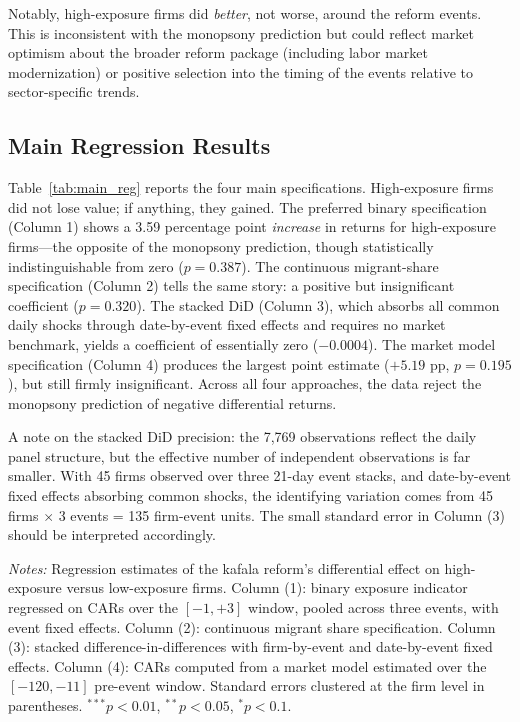 \documentclass[12pt]{article}
\newcommand{\floatfoot}[1]{\par\vspace{3pt}\footnotesize\textit{Notes:} #1}
\begin{document}
Notably, high-exposure firms did \emph{better}, not worse, around the reform events. This is inconsistent with the monopsony prediction but could reflect market optimism about the broader reform package (including labor market modernization) or positive selection into the timing of the events relative to sector-specific trends.

\subsection{Main Regression Results}

Table~\ref{tab:main_reg} reports the four main specifications. High-exposure firms did not lose value; if anything, they gained. The preferred binary specification (Column 1) shows a 3.59 percentage point \emph{increase} in returns for high-exposure firms---the opposite of the monopsony prediction, though statistically indistinguishable from zero ($p = 0.387$). The continuous migrant-share specification (Column 2) tells the same story: a positive but insignificant coefficient ($p = 0.320$). The stacked DiD (Column 3), which absorbs all common daily shocks through date-by-event fixed effects and requires no market benchmark, yields a coefficient of essentially zero ($-0.0004$). The market model specification (Column 4) produces the largest point estimate ($+5.19$ pp, $p = 0.195$), but still firmly insignificant. Across all four approaches, the data reject the monopsony prediction of negative differential returns.

A note on the stacked DiD precision: the 7,769 observations reflect the daily panel structure, but the effective number of independent observations is far smaller. With 45 firms observed over three 21-day event stacks, and date-by-event fixed effects absorbing common shocks, the identifying variation comes from 45 firms $\times$ 3 events = 135 firm-event units. The small standard error in Column (3) should be interpreted accordingly.

\begin{table}[H]
\centering
\caption{Main Regression Results}
\label{tab:main_reg}
\resizebox{\textwidth}{!}{}
\floatfoot{Regression estimates of the kafala reform's differential effect on high-exposure versus low-exposure firms. Column (1): binary exposure indicator regressed on CARs over the $[-1, +3]$ window, pooled across three events, with event fixed effects. Column (2): continuous migrant share specification. Column (3): stacked difference-in-differences with firm-by-event and date-by-event fixed effects. Column (4): CARs computed from a market model estimated over the $[-120, -11]$ pre-event window. Standard errors clustered at the firm level in parentheses. $^{***}p<0.01$, $^{**}p<0.05$, $^{*}p<0.1$.}
\end{table}
\end{document}

